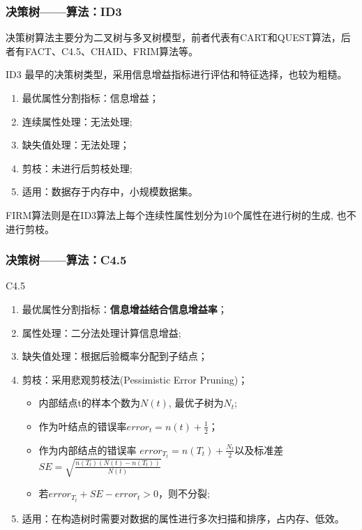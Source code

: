 \documentclass[usenames,dvipsnames]{beamer}
\begin{document}
\begin{frame}
\frametitle{决策树——算法：ID3}
决策树算法主要分为二叉树与多叉树模型，前者代表有CART和QUEST算法，后者有FACT、C4.5、CHAID、FRIM算法等。
\begin{block}{ID3}
最早的决策树类型，采用信息增益指标进行评估和特征选择，也较为粗糙。
  \begin{enumerate}
    \item 最优属性分割指标：信息增益；
    \item 连续属性处理：无法处理;
    \item 缺失值处理：无法处理；
    \item 剪枝：未进行后剪枝处理;
    \item 适用：数据存于内存中，小规模数据集。
  \end{enumerate}
\end{block}
FIRM算法则是在ID3算法上每个连续性属性划分为10个属性在进行树的生成, 也不进行剪枝。
\end{frame}
\begin{frame}
\frametitle{决策树——算法：C4.5}
\begin{block}{C4.5}
  \begin{enumerate}
    \item 最优属性分割指标：\textbf{信息增益结合信息增益率}；
    \item 属性处理：二分法处理计算信息增益; 
    \item 缺失值处理：根据后验概率分配到子结点；
    \item 剪枝：采用悲观剪枝法(Pessimistic Error Pruning)；
      \begin{itemize}
        \item 内部结点t的样本个数为$N(t)$, 最优子树为$N_t$;
        \item 作为叶结点的错误率$error_t = n(t) +\frac{1}{2}$；
        \item 作为内部结点的错误率 $error_{T_t} = n(T_t)+\frac{N_t}{2}$以及标准差$SE = \sqrt{\frac{n(T_t)(N(t)-n(T_t))}{N(t)}}$
        \item 若$error_{T_t}+SE - error_t>0$，则不分裂;
      \end{itemize} 
    \item 适用：在构造树时需要对数据的属性进行多次扫描和排序，占内存、低效。
  \end{enumerate}
\end{block}
\end{frame}
\end{document}
